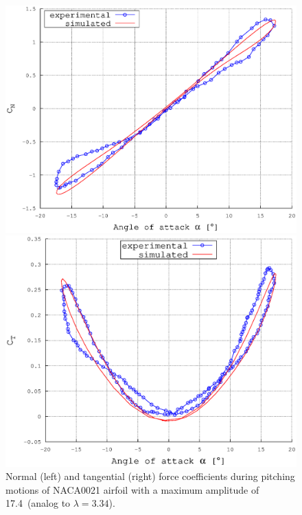 \documentclass[a4paper]{jpconf}
\begin{document}
\begin{figure}[h]
\begin{minipage}{18pc}
\includegraphics[width=\columnwidth]{CN174.eps}
\end{minipage}\hspace{2pc}%
\begin{minipage}{18pc}
\includegraphics[width=\columnwidth]{CT174.eps}
\end{minipage} 
\caption{\label{fig174}Normal (left) and tangential (right) force coefficients during pitching motions of NACA0021 airfoil with a maximum amplitude of 17.4\degree\ (analog to $\lambda = 3.34$).}
\end{figure}
\end{document}
